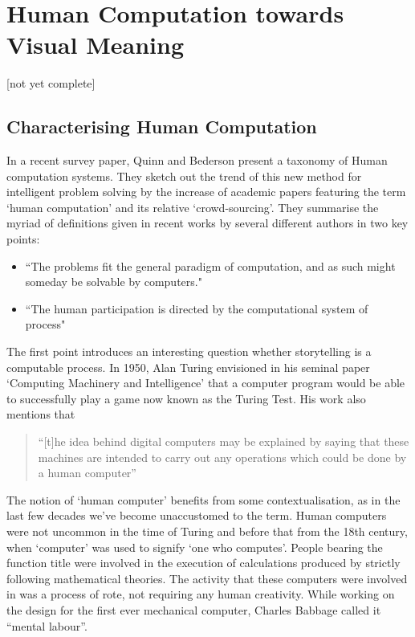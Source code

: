 \chapter{Human Computation towards Visual Meaning}
\label{ch:humancomputation}

[not yet complete]

\section{Characterising Human Computation}

In a recent survey paper, Quinn and Bederson present a taxonomy of Human computation systems\cite{Quinn:2011us}. They sketch out the trend of this new method for intelligent problem solving by the increase of academic papers featuring the term `human computation' and its relative `crowd-sourcing'. They summarise the myriad of definitions given in recent works by several different authors in two key points:

\begin{itemize}
  \item ``The problems fit  the general paradigm of computation, and as such might someday be solvable by computers."
  \item ``The human participation is directed by the computational system of process"
\end{itemize}

The first point introduces an interesting question whether storytelling is a computable process.
In 1950, Alan Turing envisioned in his seminal paper `Computing Machinery and Intelligence' that a computer program would be able to successfully play a game now known as the Turing Test. His work also mentions that 

\begin{quote}
  ``[t]he idea behind digital computers may be explained by saying that these machines are intended to carry out any operations which could be done by a human computer''\cite{Turing:1950wi}
\end{quote}

The notion of `human computer' benefits from some contextualisation, as in the last few decades we've become unaccustomed to the term. Human computers were not uncommon in the time of Turing and before that from the 18th century, when `computer' was used to signify `one who computes'\cite{grier2007computers}. People bearing the function title were involved in the execution of calculations produced by strictly following mathematical theories. The activity that these computers were involved in was a process of rote, not requiring any human creativity. While working on the design for the first ever mechanical computer, Charles Babbage called it ``mental labour''\cite[Ch.\ 20]{Babbage:1832vu}.

